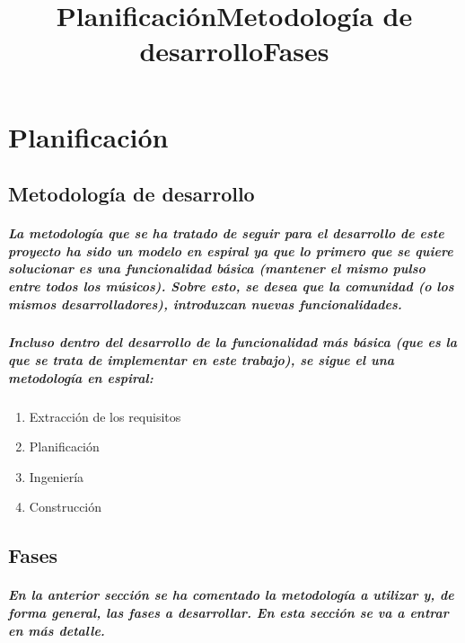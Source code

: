 \chapter{Planificación}
\title{Planificación}

\title{Metodología de desarrollo}
\section{Metodología de desarrollo}

\paragraph{
La metodología que se ha tratado de seguir para el desarrollo de este proyecto ha sido
un modelo en espiral ya que lo primero que se quiere solucionar es una funcionalidad
básica (mantener el mismo pulso entre todos los músicos). Sobre esto,
se desea que la comunidad (o los mismos desarrolladores), introduzcan nuevas
funcionalidades.
}

\paragraph{
Incluso dentro del desarrollo de la funcionalidad más básica (que es
la que se trata de implementar en este trabajo), se sigue el una metodología en espiral:
}

\begin{enumerate}
  \item Extracción de los requisitos
  \item Planificación
  \item Ingeniería
  \item Construcción
\end{enumerate}

\title{Fases}
\section{Fases}
\paragraph{
En la anterior sección se ha comentado la metodología a utilizar y, de forma general,
las fases a desarrollar. En esta sección se va a entrar en más detalle.
}

